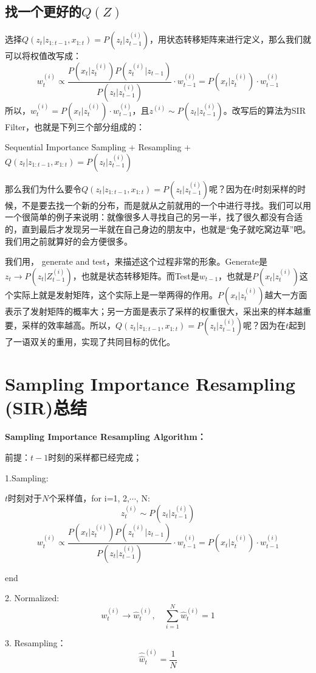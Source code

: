 \documentclass[a4paper]{article}
\begin{document}
\subsection{找一个更好的$Q(Z)$}
选择$Q(z_t|z_{1:t-1},x_{1:t})=P(z_t|z_{t-1}^{(i)})$，用状态转移矩阵来进行定义，那么我们就可以将权值改写成：
\begin{equation}
    w_t^{(i)}  \propto  \frac{P(x_t|z_t^{(i)})P(z_t^{(i)}|z_{t-1})}{P(z_t|z_{t-1}^{(i)})} \cdot w^{(i)}_{t-1} = P(x_t|z_t^{(i)})\cdot w^{(i)}_{t-1}
\end{equation}
所以，$w_t^{(i)} = P(x_t|z_t^{(i)})\cdot w^{(i)}_{t-1}$，且$z^{(i)}\sim P(z_t|z_{t-1}^{(i)})$。改写后的算法为SIR Filter，也就是下列三个部分组成的：
\begin{center}
    Sequential Importance Sampling + Resampling + $Q(z_t|z_{1:t-1},x_{1:t})=P(z_t|z_{t-1}^{(i)})$
\end{center}
那么我们为什么要令$Q(z_t|z_{1:t-1},x_{1:t})=P(z_t|z_{t-1}^{(i)})$呢？因为在$t$时刻采样的时候，不是要去找一个新的分布，而是就从之前就用的一个中进行寻找。我们可以用一个很简单的例子来说明：就像很多人寻找自己的另一半，找了很久都没有合适的，直到最后才发现另一半就在自己身边的朋友中，也就是“兔子就吃窝边草”吧。我们用之前就算好的会方便很多。

我们用，{\color{red} generate and test}，来描述这个过程非常的形象。Generate是$z_t\longrightarrow P(z_t|Z_{t-1}^{(i)})$，也就是状态转移矩阵。而Test是$w_{t-1}$，也就是$P(x_t|z_t^{(i)})$这个实际上就是发射矩阵，这个实际上是一举两得的作用。$P(x_t|z_t^{(i)})$越大一方面表示了发射矩阵的概率大；另一方面是表示了采样的权重很大，采出来的样本越重要，采样的效率越高。所以，$Q(z_t|z_{1:t-1},x_{1:t})=P(z_t|z_{t-1}^{(i)})$呢？因为在$t$起到了一语双关的重用，实现了共同目标的优化。

\section{Sampling Importance Resampling (SIR)总结}
\textbf{Sampling Importance Resampling Algorithm：}

前提：$t-1$时刻的采样都已经完成；

1.Sampling:

$t$时刻对于$N$个采样值，for i=1, 2,$\cdots$, N:
\begin{equation}
    z_t^{(i)}\sim P(z_t|z_{t-1}^{(i)})
\end{equation}
\begin{equation}
    w_t^{(i)}  \propto  \frac{P(x_t|z_t^{(i)})P(z_t^{(i)}|z_{t-1})}{P(z_t|z_{t-1}^{(i)})} \cdot w^{(i)}_{t-1} =P(x_t|z_t^{(i)})\cdot w^{(i)}_{t-1}
\end{equation}

end

2. Normalized:
\begin{equation}
    w_t^{(i)}\longrightarrow \hat{w}_t^{(i)},\quad \sum_{i=1}^N \hat{w}_t^{(i)} =1
\end{equation}


3. Resampling：
\begin{equation}
    \hat{\hat{w}}_t^{(i)} = \frac{1}{N}
\end{equation}
\end{document}
